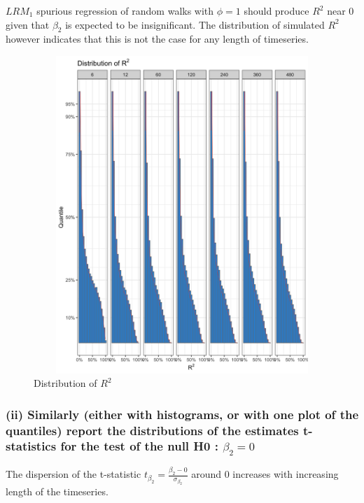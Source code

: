 \documentclass[]{article}
\begin{document}
$LRM_1$ spurious regression of random walks with $\phi=1$ should produce $R^2$ near 0 given that $\beta_2$ is expected to be insignificant. The distribution of simulated $R^2$ however indicates that this is not the case for any length of timeseries. 

\begin{figure}[H]
	\centering
	\includegraphics[width=14cm, height=12cm]{"./1ai_chart"}
	\caption[]{Distribution of $R^2$}
\end{figure}

\newpage
\subsubsection*{(ii) Similarly (either with histograms, or with one plot of the quantiles) report the distributions of the estimates t-statistics for the test of the null H0 : $\beta_2 = 0$}

The dispersion of the t-statistic $t_{\beta_2} = \frac{\beta_2 - 0}{\sigma_{\beta_2}}$ around 0 increases with increasing length of the timeseries.
\end{document}
